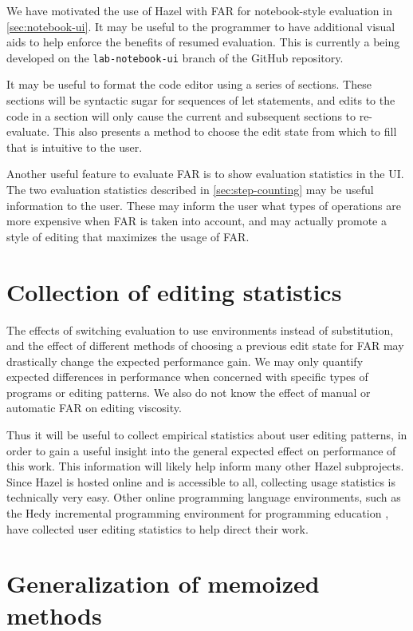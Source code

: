 We have motivated the use of Hazel with FAR for notebook-style evaluation in \cref{sec:notebook-ui}. It may be useful to the programmer to have additional visual aids to help enforce the benefits of resumed evaluation. This is currently a being developed on the \texttt{lab-notebook-ui} branch of the GitHub repository.

It may be useful to format the code editor using a series of sections. These sections will be syntactic sugar for sequences of let statements, and edits to the code in a section will only cause the current and subsequent sections to re-evaluate. This also presents a method to choose the edit state from which to fill that is intuitive to the user.

Another useful feature to evaluate FAR is to show evaluation statistics in the UI. The two evaluation statistics described in \cref{sec:step-counting} may be useful information to the user. These may inform the user what types of operations are more expensive when FAR is taken into account, and may actually promote a style of editing that maximizes the usage of FAR.

\section{Collection of editing statistics}
\label{sec:collect-edit-statistics}

The effects of switching evaluation to use environments instead of substitution, and the effect of different methods of choosing a previous edit state for FAR may drastically change the expected performance gain. We may only quantify expected differences in performance when concerned with specific types of programs or editing patterns. We also do not know the effect of manual or automatic FAR on editing viscosity.

Thus it will be useful to collect empirical statistics about user editing patterns, in order to gain a useful insight into the general expected effect on performance of this work. This information will likely help inform many other Hazel subprojects. Since Hazel is hosted online and is accessible to all, collecting usage statistics is technically very easy. Other online programming language environments, such as the Hedy incremental programming environment for programming education \cite{hermans2020hedy,gilsing2021gradual}, have collected user editing statistics to help direct their work.

\section{Generalization of memoized methods}
\label{sec:generalized-memoization}

